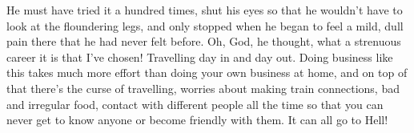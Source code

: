 He must have tried it a hundred times, shut his eyes so that he wouldn't have to look at the floundering legs, and only stopped when he began to feel a mild, dull pain there that he had never felt before. Oh, God, he thought, what a strenuous career it is that I've chosen! Travelling day in and day out. Doing business like this takes much more effort than doing your own business at home, and on top of that there's the curse of travelling, worries about making train connections, bad and irregular food, contact with different people all the time so that you can never get to know anyone or become friendly with them. It can all go to Hell!







%
